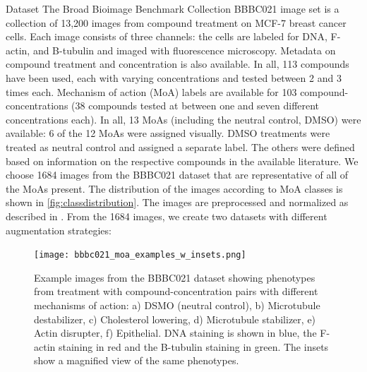 \begin{section}{Dataset}
	\label{sec:dataset}
	The Broad Bioimage Benchmark Collection BBBC021 image set \cite{bbbc021} is a collection of 13,200 images from compound treatment on MCF-7 breast cancer cells. Each image consists of three channels: the cells are labeled for DNA, F-actin, and B-tubulin and imaged with fluorescence microscopy. Metadata on compound treatment and concentration is also available\cite{Caie1913}. In all, 113 compounds have been used, each with varying concentrations and tested between 2 and 3 times each. Mechanism of action (MoA) labels are available for 103 compound-concentrations (38 compounds tested at between one and seven different concentrations each). In all, 13 MoAs (including the neutral control, DMSO) were available: 6 of the 12 MoAs were assigned visually.  DMSO treatments were treated as neutral control and assigned a separate label. The others were defined based on information on the respective compounds in the available literature.  We choose 1684 images from the BBBC021 dataset that are representative of all of the MoAs present. The distribution of the images according to MoA classes is shown in \autoref{fig:classdistribution}. The images are preprocessed and normalized as described in \cite{Godinez2017}. From the 1684 images, we create two datasets with different augmentation strategies:

		\begin{figure}[t]
			\centering
			\texttt{[image: bbbc021\_moa\_examples\_w\_insets.png]}
			\caption{\textsf{Example images from the BBBC021\cite{bbbc021} dataset showing phenotypes from treatment with compound-concentration pairs with different mechanisms of action: a) DSMO (neutral control), b) Microtubule destabilizer, c) Cholesterol lowering, d) Microtubule stabilizer,  e) Actin disrupter, f) Epithelial. DNA staining is shown in blue, the F-actin staining in red and the Β-tubulin staining in green. The insets show a magnified view of the same phenotypes.}}
			\label{fig:bbbc_whole}
	\end{figure}
	

\end{section}
